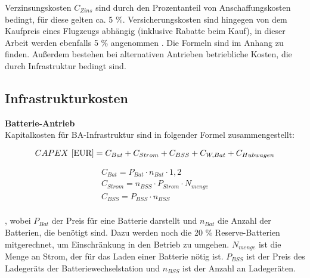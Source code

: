 Verzinsungskosten $C_{Zins}$ sind durch den Prozentanteil von Anschaffungskosten bedingt, für diese gelten ca. 5 \%. 
Versicherungskosten sind hingegen von dem Kaufpreis eines Flugzeugs abhängig (inklusive Rabatte beim Kauf), 
in dieser Arbeit werden ebenfalls 5 \% angenommen \cite{scholz_design_evaluation_doc}. Die Formeln sind im Anhang zu finden.
%
Außerdem bestehen bei alternativen Antrieben betriebliche Kosten, die durch Infrastruktur bedingt sind.
\subsection{Infrastrukturkosten}

\textbf{Batterie-Antrieb}\\
Kapitalkosten für BA-Infrastruktur sind in folgender Formel zusammengestellt:

\begin{equation}
     {CAPEX ~[\text{EUR}]} = C_{Bat} + C_{Strom} + C_{BSS} + C_{W,Bat} + C_{Hubwagen}\\
     \label{BA_Infrastruktur}
  \end{equation}

\begin{equation}
   \begin{split}
  {C_{Bat}} = P_{Bat} \cdot n_{Bat} \cdot {1,2} \\
  {C_{Strom}} = n_{BSS} \cdot P_{Strom} \cdot N_{menge}\\ %
  {C_{BSS}} = P_{BSS} \cdot n_{BSS} \\
  \label{BA}
   \end{split}
  \end{equation}

, wobei $P_{Bat}$ der Preis für eine Batterie darstellt und $n_{Bat}$ die Anzahl der Batterien, die benötigt sind. 
Dazu werden noch die 20 \% Reserve-Batterien mitgerechnet, um Einschränkung in den Betrieb zu umgehen.
$N_{menge}$ ist die Menge an Strom, der für das Laden einer Batterie nötig ist.
$P_{BSS}$ ist der Preis des Ladegeräts der Batteriewechselstation und $n_{BSS}$ ist der Anzahl an Ladegeräten. %

